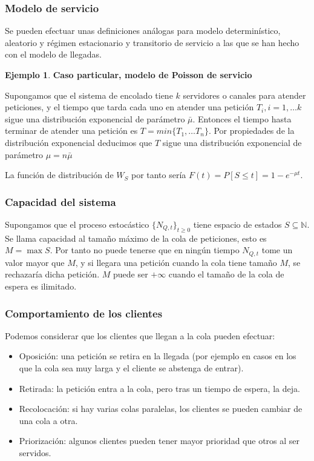 \documentclass[a4paper,10pt]{scrartcl}
\theoremstyle{definition}
\newtheorem*{eg}{Ejemplo}
\numberwithin{equation}{section}
\begin{document}
\subsubsection{Modelo de servicio}

Se pueden efectuar unas definiciones análogas para modelo determinístico, aleatorio y régimen estacionario y transitorio
de servicio a las que se han hecho con el modelo de llegadas.

\begin{eg} \textbf{Caso particular, modelo de Poisson de servicio}

Supongamos que el sistema de encolado tiene $k$ servidores o canales para atender peticiones, y el tiempo que 
tarda cada uno en atender una petición $T_i, i=1,\ldots k$ sigue una distribución exponencial de parámetro $\bar{\mu}$.
Entonces el tiempo hasta terminar de atender una petición es $T = min\{T_1, \ldots T_n\}$. Por propiedades de la
distribución exponencial deducimos que $T$ sigue una distribución exponencial de parámetro $\mu = n \bar{\mu}$

La función de distribución de $W_S$ por tanto sería $F(t) = P[S\le t] = 1 - e^{-\mu t}$.

\end{eg}

\subsubsection{Capacidad del sistema}

Supongamos que el proceso estocástico $\{N_{Q,t}\}_{t\ge 0}$ tiene espacio de estados $S\subseteq \mathbb{N}$. Se llama 
capacidad al tamaño máximo de la cola de peticiones, esto es $M = \max S$. Por tanto no puede
tenerse que en ningún tiempo $N_{Q,t}$ tome un valor mayor que $M$, y si llegara una petición cuando la cola tiene
tamaño $M$, se rechazaría dicha petición. $M$ puede ser $+\infty$ cuando el tamaño de la cola de espera es
ilimitado.

\subsubsection{Comportamiento de los clientes}
Podemos considerar que los clientes que llegan a la cola pueden efectuar:

\begin{itemize}
  \item Oposición: una petición se retira en la llegada (por ejemplo en casos en los que la cola sea muy larga
  y el cliente se abstenga de entrar).
  \item Retirada: la petición entra a la cola, pero tras un tiempo de espera, la deja.
  \item Recolocación: si hay varias colas paralelas, los clientes se pueden cambiar de una cola a otra.
  \item Priorización: algunos clientes pueden tener mayor prioridad que otros al ser servidos.
\end{itemize}
\end{document}
